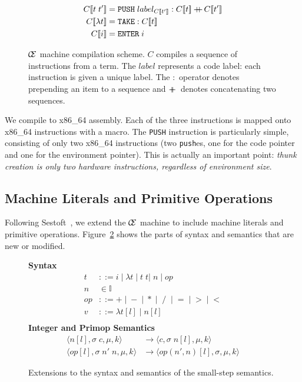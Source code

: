 \begin{figure}
\begin{align*} C[\![t \; t']\!] &= \texttt{PUSH}\;label_{C[\![t']\!]}:C[\![t]\!] \concat C[\![t']\!] \\
C[\![\lambda t]\!] &= \texttt{TAKE}:C[\![t]\!] \\
C[\![i]\!] &= \texttt{ENTER} \; i
\end{align*}
\caption{$\mathcal{\mathcal{C} \mskip -4mu \mathcal{E}}$ machine compilation scheme. $C$ compiles a sequence of
instructions from a term. The $label$ represents a code label: each instruction
is given a unique label. The $:$ operator denotes prepending an item to a
sequence and $+\!\!\!\!+\,$ denotes concatenating two sequences.}
\label{fig:cemcompile}
\end{figure}

We compile to x86\_64 assembly. Each of the three instructions is mapped onto
x86\_64 instructions with a macro. The \texttt{PUSH} instruction is particularly
simple, consisting of only two x86\_64 instructions (two \texttt{push}es, one for
the code pointer and one for the environment pointer). This is actually an
important point: \emph{thunk creation is only two hardware instructions,
regardless of environment size}.  

\subsection{Machine Literals and Primitive Operations}

Following Sestoft~\cite{sestoft}, we extend the $\mathcal{\mathcal{C} \mskip -4mu \mathcal{E}}$ machine to
include machine literals and primitive operations. Figure~\ref{fig:extsyntax}
shows the parts of syntax and semantics that are new or modified. 

\begin{figure}
\textbf{Syntax}
\begin{align*}
\tag{Term}    t &::= i \; | \; \lambda t \; | \; t \; t | \; n \; | \; op \\
\tag{Integer} n &\in \mathbb{I} \\
\tag{PrimOp} op &::= + \; | \; - \; | \; * \; | \; \; / \;\; | \; = \; | \; > \; | \; < \\
\tag{Value} v &::= \lambda t[l] \; | \; n[l] \\
\end{align*}
\textbf{Integer and Primop Semantics}
\begin{align*}
\tag{Int}
\langle n[l], \sigma \; c, \mu, k \rangle
  &\rightarrow
\langle c, \sigma \; n[l], \mu, k \rangle \\
\tag{Op} 
\langle op[l], \sigma \; n' \; n, \mu, k \rangle
  &\rightarrow
\langle op(n',n)[l], \sigma, \mu, k \rangle
\end{align*}
\caption{Extensions to the syntax and semantics of the small-step \ce semantics.}
\label{fig:extsyntax}
\end{figure}

